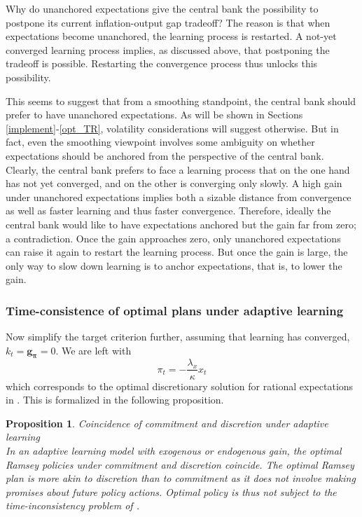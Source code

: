 \documentclass[11pt]{article}
\renewcommand{\[}{\begin{equation}}
\renewcommand{\]}{\end{equation}}
\newtheorem{prop}{Proposition}
\begin{document}
Why do unanchored expectations give the central bank the possibility to postpone its current inflation-output gap tradeoff? The reason is that when expectations become unanchored, the learning process is restarted. A not-yet converged learning process implies, as discussed above, that postponing the tradeoff is possible. Restarting the convergence process thus unlocks this possibility. 

This seems to suggest that from a smoothing standpoint, the central bank should prefer to have unanchored expectations. As will be shown in Sections \ref{implement}-\ref{opt_TR}, volatility considerations will suggest otherwise. But in fact, even the smoothing viewpoint involves some ambiguity on whether expectations should be anchored from the perspective of the central bank. Clearly, the central bank prefers to face a learning process that on the one hand has not yet converged, and on the other is converging only slowly. A high gain under unanchored expectations implies both a sizable distance from convergence as well as faster learning and thus faster convergence. Therefore, ideally the central bank would like to have expectations anchored but the gain far from zero; a contradiction. Once the gain approaches zero, only unanchored expectations can raise it again to restart the learning process. But once the gain is large, the only way to slow down learning is to anchor expectations, that is, to lower the gain.


\subsubsection{Time-consistence of optimal plans under adaptive learning}
Now simplify the target criterion further, assuming that learning has converged, $k_t = \mathbf{g_\pi} = 0$. We are left with 
\begin{equation}
\pi_t  = -\frac{\lambda_x}{\kappa}x_t \label{cgg_discretion}
\end{equation}
which corresponds to the optimal discretionary solution for rational expectations in \cite{clarida1999science}. This is formalized in the following proposition.

\begin{prop} Coincidence of commitment and discretion under adaptive learning \\
In an adaptive learning model with exogenous or endogenous gain, the optimal Ramsey policies under commitment and discretion coincide. The optimal Ramsey plan is more akin to discretion than to commitment as it does not involve making promises about future policy actions. Optimal policy is thus not subject to the time-inconsistency problem of \cite{kydland1977rules}.
\label{result_no_commitment}
\end{prop}
\end{document}
